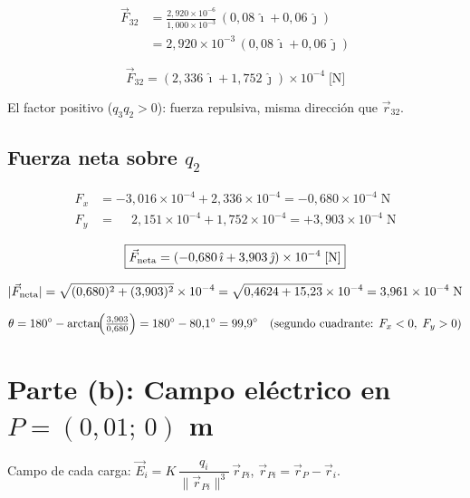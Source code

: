 \documentclass[12pt,letterpaper]{article}
\begin{document}
\begin{align*}
    \vec{F}_{32}
    &= \frac{2{,}920\times10^{-6}}{1{,}000\times10^{-3}}
       \,(0{,}08\,\hat{\imath}+0{,}06\,\hat{\jmath})\\
    &= 2{,}920\times10^{-3}\,(0{,}08\,\hat{\imath}+0{,}06\,\hat{\jmath})
\end{align*}

\begin{equation*}
    \boxed{\vec{F}_{32} = (2{,}336\,\hat{\imath}+1{,}752\,\hat{\jmath})\times10^{-4}\;\text{[N]}}
\end{equation*}

El factor positivo ($q_3 q_2 > 0$): fuerza repulsiva, misma direcci\'on que $\vec{r}_{32}$.

\subsection*{Fuerza neta sobre $q_2$}

\begin{align*}
    F_x &= -3{,}016\times10^{-4}+2{,}336\times10^{-4} = -0{,}680\times10^{-4}\;\text{N}\\
    F_y &= \phantom{-}2{,}151\times10^{-4}+1{,}752\times10^{-4} = +3{,}903\times10^{-4}\;\text{N}
\end{align*}

\begin{equation*}
    \boxed{\vec{F}_{\rm neta} = (-0{,}680\,\hat{\imath}+3{,}903\,\hat{\jmath})\times10^{-4}\;\text{[N]}}
\end{equation*}

\begin{equation*}
    |\vec{F}_{\rm neta}|
    = \sqrt{(0{,}680)^2+(3{,}903)^2}\times10^{-4}
    = \sqrt{0{,}4624+15{,}23}\times10^{-4}
    = 3{,}961\times10^{-4}\;\text{N}
\end{equation*}

\begin{equation*}
    \theta = 180^\circ - \arctan\!\Bigl(\tfrac{3{,}903}{0{,}680}\Bigr) = 180^\circ - 80{,}1^\circ = 99{,}9^\circ
    \quad\text{(segundo cuadrante: }F_x<0,\;F_y>0\text{)}
\end{equation*}

\section*{Parte (b): Campo el\'ectrico en $P=(0{,}01;\,0)$ m}

Campo de cada carga: $\vec{E}_i = K\,\dfrac{q_i}{\|\vec{r}_{Pi}\|^3}\,\vec{r}_{Pi}$,\quad
$\vec{r}_{Pi} = \vec{r}_P-\vec{r}_i$.
\end{document}
